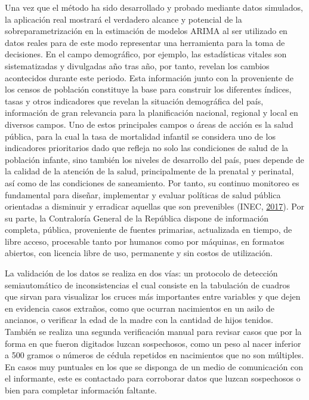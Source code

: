 \documentclass[
]{article}
\begin{document}
Una vez que el método ha sido desarrollado y probado mediante datos
simulados, la aplicación real mostrará el verdadero alcance y potencial
de la sobreparametrización en la estimación de modelos ARIMA al ser
utilizado en datos reales para de este modo representar una herramienta
para la toma de decisiones. En el campo demográfico, por ejemplo, las
estadísticas vitales son sistematizadas y divulgadas año tras año, por
tanto, revelan los cambios acontecidos durante este periodo. Esta
información junto con la proveniente de los censos de población
constituye la base para construir los diferentes índices, tasas y otros
indicadores que revelan la situación demográfica del país, información
de gran relevancia para la planificación nacional, regional y local en
diversos campos. Uno de estos principales campos o áreas de acción es la
salud pública, para la cual la tasa de mortalidad infantil se considera
uno de los indicadores prioritarios dado que refleja no solo las
condiciones de salud de la población infante, sino también los niveles
de desarrollo del país, pues depende de la calidad de la atención de la
salud, principalmente de la prenatal y perinatal, así como de las
condiciones de saneamiento. Por tanto, su continuo monitoreo es
fundamental para diseñar, implementar y evaluar políticas de salud
pública orientadas a disminuir y erradicar aquellas que son prevenibles
(INEC, \protect\hyperlink{ref-calidad_vitales}{2017}). Por su parte, la
Contraloría General de la República dispone de información completa,
pública, proveniente de fuentes primarias, actualizada en tiempo, de
libre acceso, procesable tanto por humanos como por máquinas, en
formatos abiertos, con licencia libre de uso, permanente y sin costos de
utilización.

La validación de los datos se realiza en dos vías: un protocolo de
detección semiautomático de inconsistencias el cual consiste en la
tabulación de cuadros que sirvan para visualizar los cruces más
importantes entre variables y que dejen en evidencia casos extraños,
como que ocurran nacimientos en un asilo de ancianos, o verificar la
edad de la madre con la cantidad de hijos tenidos. También se realiza
una segunda verificación manual para revisar casos que por la forma en
que fueron digitados luzcan sospechosos, como un peso al nacer inferior
a 500 gramos o números de cédula repetidos en nacimientos que no son
múltiples. En casos muy puntuales en los que se disponga de un medio de
comunicación con el informante, este es contactado para corroborar datos
que luzcan sospechosos o bien para completar información faltante.
\end{document}
